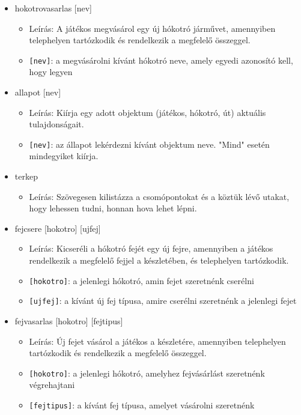\begin{itemize}

    \item hokotrovasarlas [nev]
    \begin{itemize}
        \item Leírás: A játékos megvásárol egy új hókotró járművet, amennyiben telephelyen tartózkodik és rendelkezik a megfelelő összeggel.
        \item \texttt{[nev]}: a megvásárolni kívánt hókotró neve, amely egyedi azonosító kell, hogy legyen
    \end{itemize}

    \item allapot [nev]
    \begin{itemize}
        \item Leírás: Kiírja egy adott objektum (játékos, hókotró, út) aktuális tulajdonságait.
        \item \texttt{[nev]}: az állapot lekérdezni kívánt objektum neve. "Mind" esetén mindegyiket kiírja. 
    \end{itemize}
    
    \item terkep
    \begin{itemize}
        \item Leírás: Szövegesen kilistázza a csomópontokat és a köztük lévő utakat, hogy lehessen tudni, honnan hova lehet lépni.
    \end{itemize}
    
    \item fejcsere [hokotro] [ujfej]
    \begin{itemize}
        \item Leírás: Kicseréli a hókotró fejét egy új fejre, amennyiben a játékos rendelkezik a megfelelő fejjel a készletében, és telephelyen tartózkodik.
        \item \texttt{[hokotro]}: a jelenlegi hókotró, amin fejet szeretnénk cserélni
        \item \texttt{[ujfej]}: a kívánt új fej típusa, amire cserélni szeretnénk a jelenlegi fejet
    \end{itemize}

    \item fejvasarlas [hokotro] [fejtipus]
    \begin{itemize}
        \item Leírás: Új fejet vásárol a játékos a készletére, amennyiben telephelyen tartózkodik és rendelkezik a megfelelő összeggel.
        \item \texttt{[hokotro]}: a jelenlegi hókotró, amelyhez fejvásárlást szeretnénk végrehajtani
        \item \texttt{[fejtipus]}: a kívánt fej típusa, amelyet vásárolni szeretnénk
    \end{itemize}


\end{itemize}
